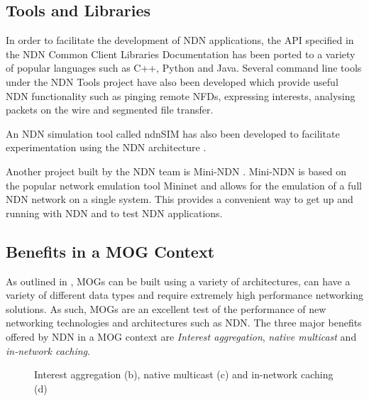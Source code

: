 \subsection{Tools and Libraries}\label{sec:ndn-tools}
In order to facilitate the development of NDN applications, the API specified in the NDN Common Client Libraries Documentation \cite{ndn-ccl} has been ported to a variety of popular languages such as C++, Python and Java. Several command line tools under the NDN Tools project \cite{ndn-tools} have also been developed which provide useful NDN functionality such as pinging remote NFDs, expressing interests, analysing packets on the wire and segmented file transfer.

An NDN simulation tool called ndnSIM \cite{ndn-sim-webpage} has also been developed to facilitate experimentation using the NDN architecture \cite{ndnsim}.  

Another project built by the NDN team is Mini-NDN \cite{mini-ndn}. Mini-NDN is based on the popular network emulation tool Mininet \cite{mininet} and allows for the emulation of a full NDN network on a single system. This provides a convenient way to get up and running with NDN and to test NDN applications.





\subsection{Benefits in a MOG Context}\label{sec:sota:mog-ndn-benefits}
As outlined in , MOGs can be built using a variety of architectures, can have a variety of different data types and require extremely high performance networking solutions. As such, MOGs are an excellent test of the performance of new networking technologies and architectures such as NDN. The three major benefits offered by NDN in a MOG context are \textit{Interest aggregation}, \textit{native multicast} and \textit{in-network caching}.

\begin{figure}[H]
    \centering
    \caption{Interest aggregation (b), native multicast (c) and in-network caching (d)}
    \label{fig:agg-multicast}
\end{figure}


